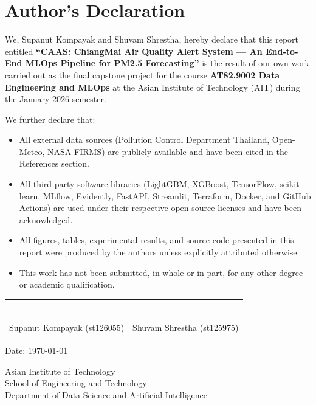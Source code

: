 \chapter*{Author's Declaration}

We, Supanut Kompayak and Shuvam Shrestha, hereby declare that this report
entitled \textbf{``CAAS: ChiangMai Air Quality Alert System --- An End-to-End
MLOps Pipeline for PM2.5 Forecasting''} is the result of our own work carried
out as the final capstone project for the course
\textbf{AT82.9002 Data Engineering and MLOps} at the
Asian Institute of Technology (AIT) during the January 2026 semester.

We further declare that:

\begin{itemize}
    \item All external data sources (Pollution Control Department Thailand,
          Open-Meteo, NASA FIRMS) are publicly available and have been cited
          in the References section.

    \item All third-party software libraries (LightGBM, XGBoost, TensorFlow,
          scikit-learn, MLflow, Evidently, FastAPI, Streamlit, Terraform,
          Docker, and GitHub Actions) are used under their respective
          open-source licenses and have been acknowledged.

    \item All figures, tables, experimental results, and source code presented
          in this report were produced by the authors unless explicitly
          attributed otherwise.

    \item This work has not been submitted, in whole or in part, for any
          other degree or academic qualification.
\end{itemize}

\vspace{1cm}

\noindent
\begin{tabular}{@{}ll@{}}
\rule{6cm}{0.4pt} \quad & \rule{6cm}{0.4pt} \\
Supanut Kompayak (st126055) & Shuvam Shrestha (st125975) \\
\end{tabular}

\vspace{0.5cm}

\noindent Date: \today

\vspace{1cm}

\noindent Asian Institute of Technology \\
School of Engineering and Technology \\
Department of Data Science and Artificial Intelligence
